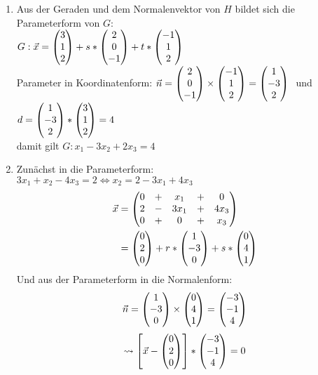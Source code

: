 \begin{lsg}{}
\begin{enumerate}
		\item Aus der Geraden und dem Normalenvektor von $H$ bildet sich die Parameterform von $G$: \\$G: \vec{x}=\begin{pmatrix} 3\\1\\2 \end{pmatrix}+s*\begin{pmatrix} 2\\0\\-1 \end{pmatrix}+t*\begin{pmatrix} -1\\1\\2 \end{pmatrix}$\\
		Parameter in Koordinatenform:
		$\vec{n}=\begin{pmatrix} 2\\0\\-1 \end{pmatrix}\times \begin{pmatrix} -1\\1\\2 \end{pmatrix}=\begin{pmatrix} 1\\-3\\2 \end{pmatrix}\ $ und $d=\begin{pmatrix} 1\\-3\\2 \end{pmatrix}*\begin{pmatrix} 3\\1\\2 \end{pmatrix}=4$\\
		damit gilt $G:x_1-3x_2+2x_3=4$
		\item Zunächst in die Parameterform:\\
		$3x_1+x_2-4x_3=2 \Longleftrightarrow x_2=2-3x_1+4x_3$
		\begin{align*}
			\vec x &=\begin{pmatrix} 0 &+& x_1 &+& 0\\2 &-& 3x_1 &+& 4x_3\\0 &+& 0 &+& x_3 \end{pmatrix}\\
							&=\begin{pmatrix} 0\\2\\0 \end{pmatrix}+r*\begin{pmatrix} 1\\-3\\0 \end{pmatrix}+s*\begin{pmatrix} 0\\4\\1 \end{pmatrix}
		\end{align*}
		Und aus der Parameterform in die Normalenform:
		\begin{equation*}
			\vec n=\begin{pmatrix} 1\\-3\\0 \end{pmatrix}\times\begin{pmatrix} 0\\4\\1 \end{pmatrix}=\begin{pmatrix} -3\\-1\\4 \end{pmatrix}
		\end{equation*}
		\begin{equation*}
			\rightsquigarrow \left[\vec x-\begin{pmatrix} 0\\2\\0 \end{pmatrix}\right]*\begin{pmatrix} -3\\-1\\4 \end{pmatrix}=0
		\end{equation*}
	\end{enumerate}
\end{lsg}



